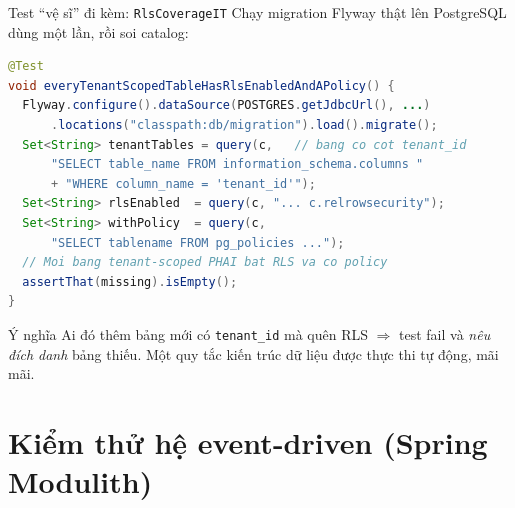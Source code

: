 \documentclass[aspectratio=169,12pt]{beamer}
\begin{document}
\begin{frame}[fragile]{Test ``vệ sĩ'' đi kèm: \texttt{RlsCoverageIT}}
  Chạy migration Flyway thật lên PostgreSQL dùng một lần, rồi soi catalog:
\begin{lstlisting}[language=Java,style=codesm,basicstyle=\ttfamily\scriptsize]
@Test
void everyTenantScopedTableHasRlsEnabledAndAPolicy() {
  Flyway.configure().dataSource(POSTGRES.getJdbcUrl(), ...)
      .locations("classpath:db/migration").load().migrate();
  Set<String> tenantTables = query(c,   // bang co cot tenant_id
      "SELECT table_name FROM information_schema.columns "
      + "WHERE column_name = 'tenant_id'");
  Set<String> rlsEnabled  = query(c, "... c.relrowsecurity");
  Set<String> withPolicy  = query(c,
      "SELECT tablename FROM pg_policies ...");
  // Moi bang tenant-scoped PHAI bat RLS va co policy
  assertThat(missing).isEmpty();
}
\end{lstlisting}
  \begin{exampleblock}{Ý nghĩa}
    Ai đó thêm bảng mới có \texttt{tenant\_id} mà quên RLS $\Rightarrow$ test
    fail và \emph{nêu đích danh} bảng thiếu. Một quy tắc kiến trúc dữ liệu
    được thực thi tự động, mãi mãi.
  \end{exampleblock}
\end{frame}

\section{Kiểm thử hệ event-driven (Spring Modulith)}
\end{document}
